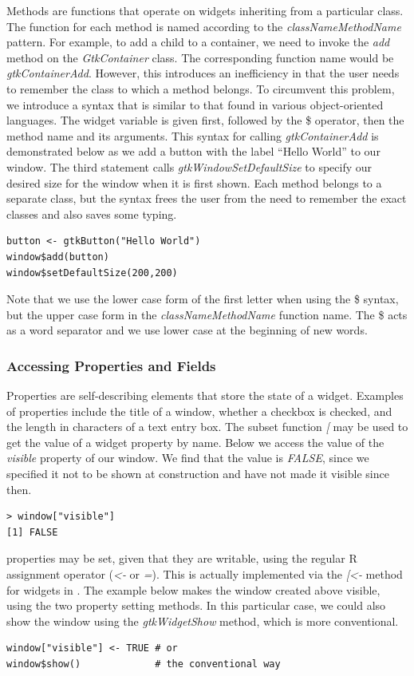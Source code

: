 \documentclass[article]{jss}
\begin{document}
Methods are functions that operate on widgets inheriting from a
particular class.
The  function for each  method is named according
to the 
\emph{classNameMethodName} pattern. For example, to add a child to a
container, we 
need to invoke the \emph{add} method on the \emph{GtkContainer} class. 
The corresponding function name would be \emph{gtkContainerAdd}.
However, this 
introduces an inefficiency in that the user needs to remember the
class to which
a method belongs. To circumvent this problem, we introduce a syntax
that is similar
to that found in various object-oriented languages. The widget
variable is given first, followed by the \$ operator, then the method
name and its arguments. This syntax for calling \emph{gtkContainerAdd}
is demonstrated 
below as we add a button with the label ``Hello World'' to our window.
The
third statement calls \emph{gtkWindowSetDefaultSize} to specify our
desired
size for the window when it is first shown. Each method belongs to a
separate
class, but the syntax frees the user from the need to remember the
exact classes
and also saves some typing.
\begin{verbatim}
button <- gtkButton("Hello World")
window$add(button)
window$setDefaultSize(200,200)
\end{verbatim}
Note that we use the lower case form of the first letter when using
the \$ syntax, but the upper case form in the
\emph{classNameMethodName} function name. The \$ acts as a word
separator and we use lower case at the beginning of new words.



\subsubsection{Accessing Properties and Fields}

Properties are self-describing elements that store the state of a
widget.
Examples of properties include the title of a window, whether a
checkbox is checked, and
the length in characters of a text entry box. The  subset
function 
\emph{[} may be used to get the value of a widget property by name.
Below we access the value of the \emph{visible} property of our
window. We
find that the value is \emph{FALSE}, since we specified it not to be
shown
at construction and have not made it visible since then.
\begin{verbatim}
> window["visible"]
[1] FALSE
\end{verbatim}

 properties may be set, given that they are writable, using
the regular R assignment operator (\emph{<-} or \emph{=}). This is
actually implemented via the \emph{[<-} method for  widgets
in . The example below makes the window created above
visible, using the two property setting methods. In this particular
case, we could also show the window using the \emph{gtkWidgetShow}
method, which is more conventional.
\begin{verbatim}
window["visible"] <- TRUE # or
window$show()             # the conventional way
\end{verbatim}
\end{document}
